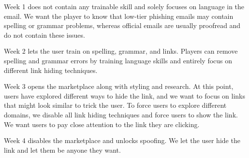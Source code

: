 Week 1 does not contain any trainable skill and solely focuses on language in the email. We want the player to know that low-tier phishing emails may contain spelling or grammar problems, whereas official emails are usually proofread and do not contain these issues.

Week 2 lets the user train on spelling, grammar, and links. Players can remove spelling and grammar errors by training language skills and entirely focus on different link hiding techniques.

Week 3 opens the marketplace along with styling and research. At this point, users have explored different ways to hide the link, and we want to focus on links that might look similar to trick the user. To force users to explore different domains, we disable all link hiding techniques and force users to show the link. We want users to pay close attention to the link they are clicking.

Week 4 disables the marketplace and unlocks spoofing. We let the user hide the link and let them be anyone they want.